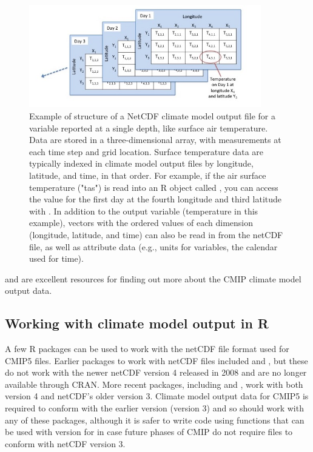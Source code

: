 \begin{figure}
\begin{center}
\includegraphics[width = 0.9\textwidth]{netcdf_structure_example}
\end{center}
\caption{Example of structure of a NetCDF climate model output file for a variable reported at a single depth, like surface air temperature. Data are stored in a three-dimensional array, with measurements at each time step and grid location. Surface temperature data are typically indexed in climate model output files by longitude, latitude, and time, in that order. For example, if the air surface temperature ("tas") is read into an R object called , you can access the value for the first day at the fourth longitude and third latitude with . In addition to the output variable (temperature in this example), vectors with the ordered values of each dimension (longitude, latitude, and time) can also be read in from the netCDF file, as well as attribute data (e.g., units for variables, the calendar used for time).}
\label{fig:netcdfexample}
\end{figure}

\citet{taylor2012overview} and \citet{meehl2007wcrp} are excellent
resources for finding out more about the CMIP climate model output data.

\subsection{Working with climate model output in
R}\label{working-with-climate-model-output-in-r}

A few R packages can be used to work with the netCDF file format used
for CMIP5 files. Earlier packages to work with netCDF files included
 and , but these do not work with the newer netCDF
version 4 released in 2008 and are no longer available through CRAN.
More recent packages, including  \citep{ncdf4} and
 \citep{michna2013rnetcdf, RNetCDF}, work with both version
4 and netCDF's older version 3. Climate model output data for CMIP5 is
required to conform with the earlier version (version 3)
\citep{taylor2010cmip5} and so should work with any of these packages,
although it is safer to write code using functions that can be used with
version for in case future phases of CMIP do not require files to
conform with netCDF version 3.

